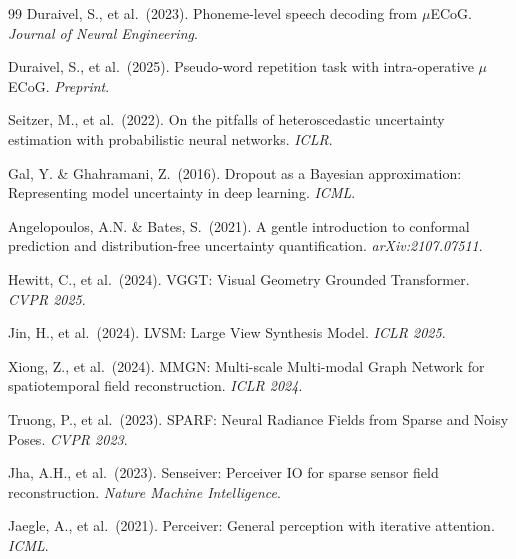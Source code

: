 \documentclass[11pt,letterpaper]{article}
\begin{document}
\begin{thebibliography}{99}
Duraivel, S., et al.\ (2023).
Phoneme-level speech decoding from $\mu$ECoG.
\textit{Journal of Neural Engineering}.

Duraivel, S., et al.\ (2025).
Pseudo-word repetition task with intra-operative $\mu$ECoG.
\textit{Preprint}.

Seitzer, M., et al.\ (2022).
On the pitfalls of heteroscedastic uncertainty estimation with probabilistic neural networks.
\textit{ICLR}.

Gal, Y. \& Ghahramani, Z.\ (2016).
Dropout as a Bayesian approximation: Representing model uncertainty in deep learning.
\textit{ICML}.

Angelopoulos, A.N. \& Bates, S.\ (2021).
A gentle introduction to conformal prediction and distribution-free uncertainty quantification.
\textit{arXiv:2107.07511}.

Hewitt, C., et al.\ (2024).
VGGT: Visual Geometry Grounded Transformer.
\textit{CVPR 2025}.

Jin, H., et al.\ (2024).
LVSM: Large View Synthesis Model.
\textit{ICLR 2025}.

Xiong, Z., et al.\ (2024).
MMGN: Multi-scale Multi-modal Graph Network for spatiotemporal field reconstruction.
\textit{ICLR 2024}.

Truong, P., et al.\ (2023).
SPARF: Neural Radiance Fields from Sparse and Noisy Poses.
\textit{CVPR 2023}.

Jha, A.H., et al.\ (2023).
Senseiver: Perceiver IO for sparse sensor field reconstruction.
\textit{Nature Machine Intelligence}.

Jaegle, A., et al.\ (2021).
Perceiver: General perception with iterative attention.
\textit{ICML}.

\end{thebibliography}
\end{document}
